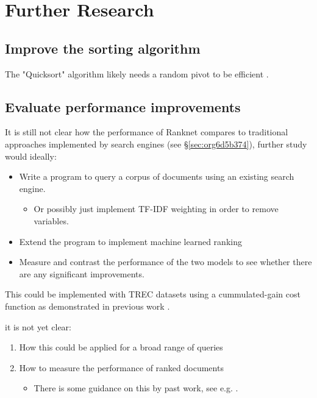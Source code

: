 \documentclass[a4paper,11pt,twoside]{article}
\begin{document}
\section{Further Research}
\label{sec:orgda44789}


\subsection{Improve the sorting algorithm}
\label{sec:org6762b82}
The "Quicksort" algorithm likely needs a random pivot to be
efficient \cite{timroughgardenQuicksortOverview2017}. 

\subsection{Evaluate performance improvements}
\label{sec:orgbbb7ce6}
It is still not clear how the
performance of Ranknet compares to traditional approaches
implemented by search engines (see \S \ref{sec:org6d5b374}), further
study would ideally:

\begin{itemize}
\item Write a program to query a corpus of documents using an existing search engine.
\begin{itemize}
\item Or possibly just implement TF-IDF weighting in order to remove variables.
\end{itemize}
\item Extend the program to implement machine learned ranking
\item Measure and contrast the performance of the two models to see
whether there are any significant improvements.
\end{itemize}

This could be implemented with TREC datasets
\cite{usnationalinstituteofstandardsandtechnologyTextREtrievalConference}
using a cummulated-gain cost function
\cite{jarvelinCumulatedGainbasedEvaluation2002} as demonstrated in
previous work \cite{viksinghComparisonOpenSource2009}.


it is not yet clear:

\begin{enumerate}
\item How this could be applied for a broad range of queries
\item How to measure the performance of ranked documents
\begin{itemize}
\item There is some guidance on this by past work, see e.g. \cite{viksinghComparisonOpenSource2009}.
\end{itemize}
\end{enumerate}
\end{document}
